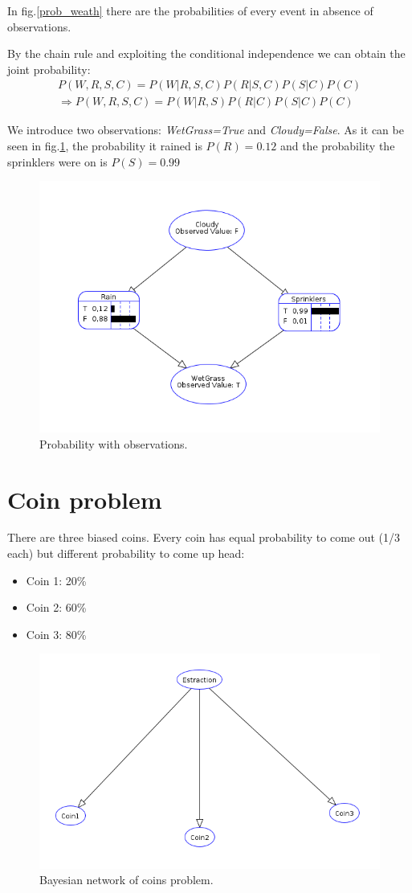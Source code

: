 \documentclass[10pt,a4paper]{article}
\begin{document}
In fig.\ref{prob_weath} there are the probabilities of every event in absence of observations.

By the chain rule and exploiting the conditional independence we can obtain the joint probability:
\begin{align*}
P(W,R,S,C)=P(W|R,S,C) P(R|S,C)P(S|C)P(C)  \\ 
\Rightarrow P(W,R,S,C)=P(W|R,S)P(R|C)P(S|C)P(C)
\end{align*}

We introduce two observations: \emph{WetGrass=True} and \emph{Cloudy=False}. As it can be seen in fig.\ref{fig:Rain_solved}, the probability it rained is $P(R)=0.12$ and the probability the sprinklers were on is $P(S)=0.99$

\begin{figure}
\centering
\includegraphics[width=0.7\linewidth]{../Rain_solved}
\caption{Probability with observations.}
\label{fig:Rain_solved}
\end{figure}

\section{Coin problem}

There are three biased coins. Every coin has equal probability to come out (1/3 each) but different probability to come up head:
\begin{itemize}
	\item Coin 1: 20\%
	\item Coin 2: 60\%
	\item Coin 3: 80\%
\end{itemize}  	

\begin{figure}[h]
\centering
\includegraphics[width=0.7\linewidth]{../Coin}
\caption{Bayesian network of coins problem.}
\label{fig:Coin}
\end{figure}
\end{document}
